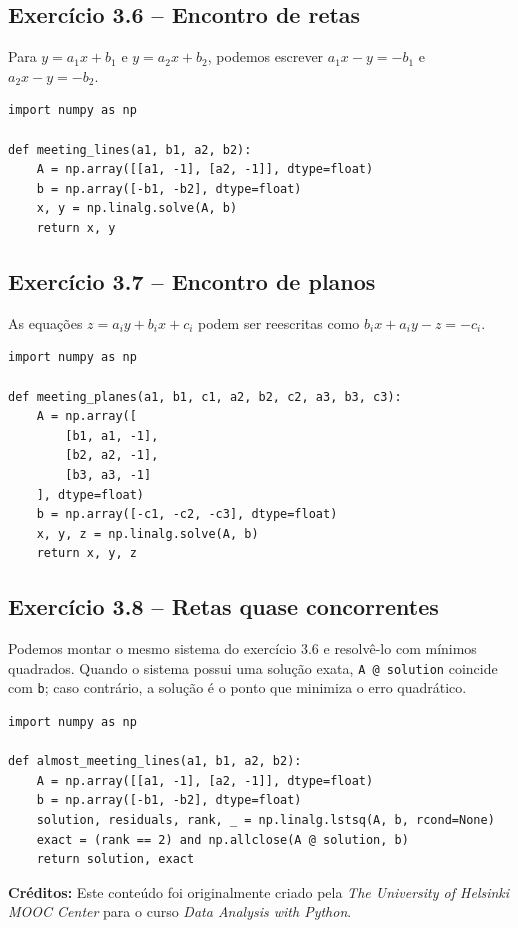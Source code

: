 \documentclass[11pt,a4paper]{article}
\begin{document}
\subsection*{Exercício 3.6 -- Encontro de retas}
\begin{solucao}
Para $y = a_1x + b_1$ e $y = a_2x + b_2$, podemos escrever $a_1x - y = -b_1$ e $a_2x - y = -b_2$.
\begin{lstlisting}
import numpy as np

def meeting_lines(a1, b1, a2, b2):
    A = np.array([[a1, -1], [a2, -1]], dtype=float)
    b = np.array([-b1, -b2], dtype=float)
    x, y = np.linalg.solve(A, b)
    return x, y
\end{lstlisting}
\end{solucao}

\subsection*{Exercício 3.7 -- Encontro de planos}
\begin{solucao}
As equações $z = a_iy + b_ix + c_i$ podem ser reescritas como $b_ix + a_iy - z = -c_i$.
\begin{lstlisting}
import numpy as np

def meeting_planes(a1, b1, c1, a2, b2, c2, a3, b3, c3):
    A = np.array([
        [b1, a1, -1],
        [b2, a2, -1],
        [b3, a3, -1]
    ], dtype=float)
    b = np.array([-c1, -c2, -c3], dtype=float)
    x, y, z = np.linalg.solve(A, b)
    return x, y, z
\end{lstlisting}
\end{solucao}

\subsection*{Exercício 3.8 -- Retas quase concorrentes}
\begin{solucao}
Podemos montar o mesmo sistema do exercício 3.6 e resolvê-lo com mínimos quadrados. Quando o sistema possui uma solução exata, \texttt{A @ solution} coincide com \texttt{b}; caso contrário, a solução é o ponto que minimiza o erro quadrático.
\begin{lstlisting}
import numpy as np

def almost_meeting_lines(a1, b1, a2, b2):
    A = np.array([[a1, -1], [a2, -1]], dtype=float)
    b = np.array([-b1, -b2], dtype=float)
    solution, residuals, rank, _ = np.linalg.lstsq(A, b, rcond=None)
    exact = (rank == 2) and np.allclose(A @ solution, b)
    return solution, exact
\end{lstlisting}
\end{solucao}

\vspace{2em}
\noindent\textbf{Créditos:} Este conteúdo foi originalmente criado pela \textit{The University of Helsinki MOOC Center} para o curso \textit{Data Analysis with Python}.
\end{document}
